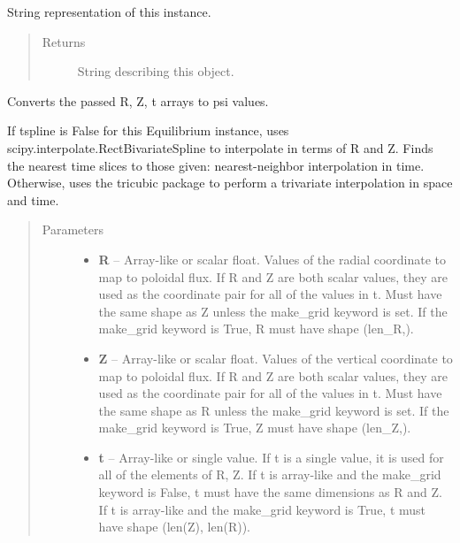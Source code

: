 \documentclass[letterpaper,10pt,english]{sphinxmanual}
\begin{document}
\begin{fulllineitems}
\begin{fulllineitems}
\label{eqtools:eqtools.core.Equilibrium.__str__}
String representation of this instance.
\begin{quote}\begin{description}
\item[{Returns}] \leavevmode
String describing this object.

\end{description}\end{quote}

\end{fulllineitems}


\begin{fulllineitems}
\label{eqtools:eqtools.core.Equilibrium.rz2psi}
Converts the passed R, Z, t arrays to psi values.

If tspline is False for this Equilibrium instance, uses
scipy.interpolate.RectBivariateSpline to interpolate in terms of R and
Z. Finds the nearest time slices to those given: nearest-neighbor
interpolation in time. Otherwise, uses the tricubic package to perform
a trivariate interpolation in space and time.
\begin{quote}\begin{description}
\item[{Parameters }] \leavevmode\begin{itemize}
\item {} 
\textbf{R} --
Array-like or scalar float.
Values of the radial coordinate to
map to poloidal flux. If R and Z are both scalar values, they
are used as the coordinate pair for all of the values in t.
Must have the same shape as Z unless the make\_grid keyword is
set. If the make\_grid keyword is True, R must have shape (len\_R,).

\item {} 
\textbf{Z} --
Array-like or scalar float.
Values of the vertical coordinate to
map to poloidal flux. If R and Z are both scalar values, they
are used as the coordinate pair for all of the values in t.
Must have the same shape as R unless the make\_grid keyword is
set. If the make\_grid keyword is True, Z must have shape (len\_Z,).

\item {} 
\textbf{t} --
Array-like or single value.
If t is a single value, it is used
for all of the elements of R, Z. If t is array-like and the
make\_grid keyword is False, t must have the same dimensions as
R and Z. If t is array-like and the make\_grid keyword is True,
t must have shape (len(Z), len(R)).


\end{itemize}
\end{description}
\end{quote}
\end{fulllineitems}
\end{fulllineitems}
\end{document}
